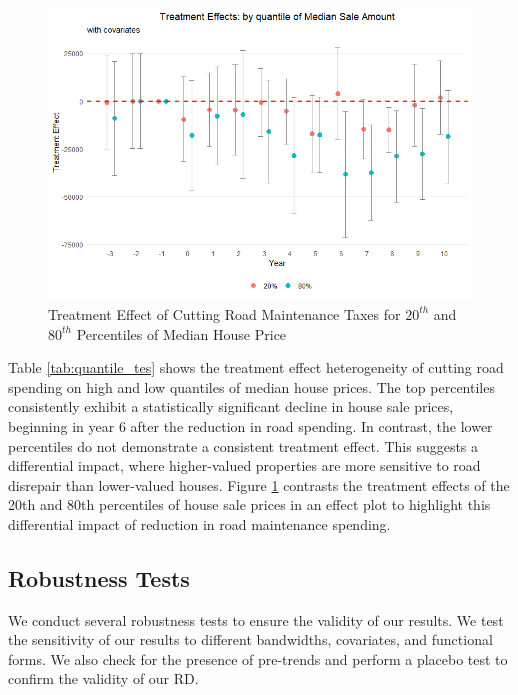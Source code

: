 \begin{figure}[htbp]
    \centering
    \includegraphics[width=\textwidth,keepaspectratio]{images/tes_qte_re.png}    
    \caption{Treatment Effect of Cutting Road Maintenance Taxes for $20^{th}$ and $80^{th}$ Percentiles of Median House Price}
    \label{fig:tes_qte_covs}
\end{figure}

Table \ref{tab:quantile_tes} shows the treatment effect heterogeneity of cutting road spending on high and low quantiles of median house prices. The top percentiles consistently exhibit a statistically significant decline in house sale prices, beginning in year 6 after the reduction in road spending. In contrast, the lower percentiles do not demonstrate a consistent treatment effect. This suggests a differential impact, where higher-valued properties are more sensitive to road disrepair than lower-valued houses. Figure \ref{fig:tes_qte_covs} contrasts the treatment effects of the 20th and 80th percentiles of house sale prices in an effect plot to highlight this differential impact of reduction in road maintenance spending.

\subsection{Robustness Tests}

We conduct several robustness tests to ensure the validity of our results. We test the sensitivity of our results to different bandwidths, covariates, and functional forms. We also check for the presence of pre-trends and perform a placebo test to confirm the validity of our RD.

